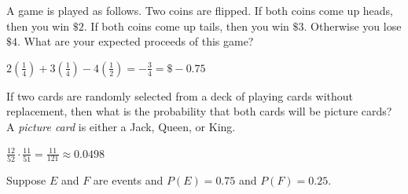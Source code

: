 \documentclass[answers,addpoints,12pt]{exam}
\begin{document}
\begin{questions}
\question[10] A game is played as follows.
Two coins are flipped. If both coins come up
heads, then you win $\$2$. If both coins come
up tails, then you win $\$3$. 
Otherwise you lose $\$4$. What are your expected proceeds
of this game?
\begin{solution}
$2\left(\frac{1}{4}\right)+3\left(\frac{1}{4}\right)
-4\left(\frac{1}{2}\right)=-\frac{3}{4}=\$-0.75$
\end{solution}

\question[10] If two cards are randomly selected from a deck
of playing cards without replacement,
then what is the probability that both cards
will be picture cards?  A {\em picture card} is either a Jack, Queen, or King.
\begin{solution}
$\frac{12}{52}\cdot\frac{11}{51}=\frac{11}{121}\approx 0.0498$
\end{solution}

\question[15] Suppose $E$ and $F$ are events
and $P\left(E\right)=0.75$ and $P\left(F\right)=0.25$.
\begin{solution}
\end{solution}


\end{questions}
\end{document}
